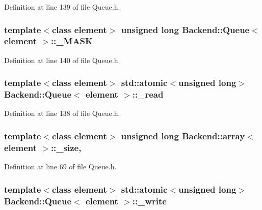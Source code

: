 Definition at line 139 of file Queue.\+h.

\hypertarget{classBackend_1_1Queue_ab665bcab528d6bad6c4faab1ae0fc1b4}{
\subsubsection[{\+\_\+\+M\+A\+S\+K}]{\setlength{\rightskip}{0pt plus 5cm}template$<$class element$>$ unsigned long {\bf Backend\+::\+Queue}$<$ element $>$\+::\+\_\+\+M\+A\+S\+K\hspace{0.3cm}{\ttfamily [protected]}}}\label{classBackend_1_1Queue_ab665bcab528d6bad6c4faab1ae0fc1b4}


Definition at line 140 of file Queue.\+h.

\hypertarget{classBackend_1_1Queue_a508eb8c4fedb73fc4abbf26353bdfd82}{
\subsubsection[{\+\_\+read}]{\setlength{\rightskip}{0pt plus 5cm}template$<$class element$>$ std\+::atomic$<$unsigned long$>$ {\bf Backend\+::\+Queue}$<$ element $>$\+::\+\_\+read\hspace{0.3cm}{\ttfamily [protected]}}}\label{classBackend_1_1Queue_a508eb8c4fedb73fc4abbf26353bdfd82}


Definition at line 138 of file Queue.\+h.

\hypertarget{classBackend_1_1array_ae51d64e87b42931946111c28b98e8a18}{
\subsubsection[{\+\_\+size}]{\setlength{\rightskip}{0pt plus 5cm}template$<$class element$>$ unsigned long {\bf Backend\+::array}$<$ element $>$\+::\+\_\+size\hspace{0.3cm}{\ttfamily [protected]}, {\ttfamily [inherited]}}}\label{classBackend_1_1array_ae51d64e87b42931946111c28b98e8a18}


Definition at line 69 of file Queue.\+h.

\hypertarget{classBackend_1_1Queue_ab3d5c4738092cf356b36c56f6ab61554}{
\subsubsection[{\+\_\+write}]{\setlength{\rightskip}{0pt plus 5cm}template$<$class element$>$ std\+::atomic$<$unsigned long$>$ {\bf Backend\+::\+Queue}$<$ element $>$\+::\+\_\+write\hspace{0.3cm}{\ttfamily [protected]}}}\label{classBackend_1_1Queue_ab3d5c4738092cf356b36c56f6ab61554}


